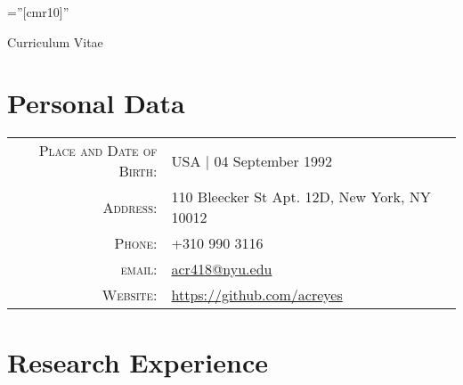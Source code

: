 \documentclass[a4paper,10pt]{article} %
\begin{document}
\font\fb=''[cmr10]'' %

\par{\centering\Large Curriculum Vitae\par}
\par{\bigskip\par} %

\section{Personal Data}

\begin{tabular}{rl}
\textsc{Place and Date of Birth:} & USA  | 04 September 1992 \\
\textsc{Address:} & 110 Bleecker St Apt. 12D, New York, NY 10012\\
\textsc{Phone:} & +310 990 3116\\
\textsc{email:} & \href{mailto:acr418@nyu.edu}{acr418@nyu.edu}\\
\textsc{Website:} & \url{https://github.com/acreyes}
\end{tabular}


\section{Research Experience}
\end{document}
